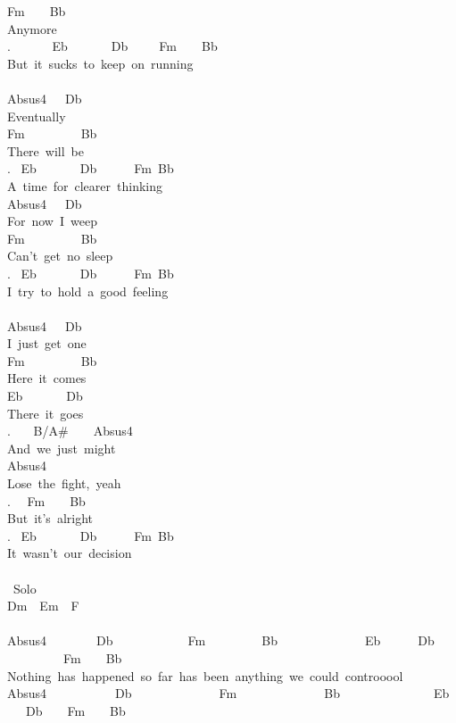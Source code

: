 {Fm\ \ \ \ Bb\\
Anymore\\
. \ \ \ \ \ \ Eb\ \ \ \ \ \ \ Db\ \ \ \ \ Fm\ \ \ \ Bb\\
But\ it\ sucks\ to\ keep\ on\ running\\
\\
Absus4\ \ \ Db\\
Eventually\\
Fm\ \ \ \ \ \ \ \ \ Bb\\
There\ will\ be\\
. \ Eb\ \ \ \ \ \ \ Db\ \ \ \ \ \ Fm\ Bb\\
A\ time\ for\ clearer\ thinking\\
Absus4\ \ \ Db\\
For\ now\ I\ weep\\
Fm\ \ \ \ \ \ \ \ \ Bb\\
Can't\ get\ no\ sleep\\
. \ Eb\ \ \ \ \ \ \ Db\ \ \ \ \ \ Fm\ Bb\\
I\ try\ to\ hold\ a\ good\ feeling\\
\\
Absus4\ \ \ Db\\
I\ just\ get\ one\\
Fm\ \ \ \ \ \ \ \ \ Bb\\
Here\ it\ comes\\
Eb\ \ \ \ \ \ \ Db\\
There\ it\ goes\\
. \ \ \ B/A\#\ \ \ \ Absus4\ \\
And\ we\ just\ might\\
Absus4\ \ \ \\
Lose\ the\ fight,\ yeah\\
. \ \ Fm\ \ \ \ Bb\\
But\ it's\ alright\\
. \ Eb\ \ \ \ \ \ \ Db\ \ \ \ \ \ Fm\ Bb\\
It\ wasn't\ our\ decision\\
\\
\lbrack\ Solo\rbrack\\
Dm\ \ Em\ \ F\\
\\
Absus4\ \ \ \ \ \ \ \ Db\ \ \ \ \ \ \ \ \ \ \ \ Fm\ \ \ \ \ \ \ \ \ Bb\ \ \ \ \ \ \ \ \ \ \ \ \ \ Eb\ \ \ \ \ \ Db\ \ \ \ \ \ \ \ \ \ \ \ Fm\ \ \ \ Bb\\
Nothing\ has\ happened\ so\ far\ has\ been\ anything\ we\ could\ controoool\\
Absus4\ \ \ \ \ \ \ \ \ \ \ Db\ \ \ \ \ \ \ \ \ \ \ \ \ \ Fm\ \ \ \ \ \ \ \ \ \ \ \ \ \ Bb\ \ \ \ \ \ \ \ \ \ \ \ \ \ \ Eb\ \ \ \ Db\ \ \ \ Fm\ \ \ \ Bb\\
}

